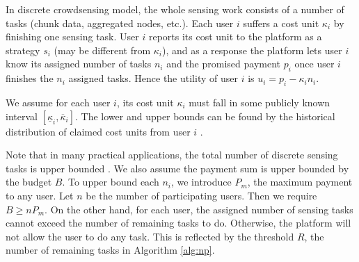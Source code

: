 \documentclass[conference]{IEEEtran}
\theoremstyle{definition}
\begin{document}

In discrete crowdsensing model, the whole sensing work consists of a number of tasks (chunk data, aggregated nodes, etc.). Each user $i$ suffers a cost unit $\kappa_i$ by finishing one sensing task. User $i$ reports its cost unit to the platform as a strategy $s_i$ (may be different from $\kappa_i$), and as a response the platform lets user $i$ know its assigned number of tasks $n_i$ and the promised payment $p_i$ once user $i$ finishes the $n_i$ assigned tasks. Hence the utility of user $i$ is $u_i = p_i - \kappa_i n_i$. %

{\color{blue} 
We assume for each user $i$, its cost unit $\kappa_i$ must fall in some publicly known interval $[\underline{\kappa}_i,\overline{\kappa}_i]$. The lower and upper bounds can be found by the historical distribution of claimed cost units from user $i$ \cite{koutsopoulos2013optimal}.

Note that in many practical applications, the total number of discrete sensing tasks is upper bounded \cite{Alt2010Location,Liu2013A,li2012location}. We also assume the payment sum is upper bounded by the budget $B$. To upper bound each $n_i$, we introduce $P_m$, the maximum payment to any user. Let $n$ be the number of participating users. Then we require $B\geq nP_m$. On the other hand, for each user, the assigned number of sensing tasks cannot exceed the number of remaining tasks to do. Otherwise, the platform will not allow the user to do any task. This is reflected by the threshold $R$, the number of remaining tasks in Algorithm \ref{alg:np}.
}

\end{document}
